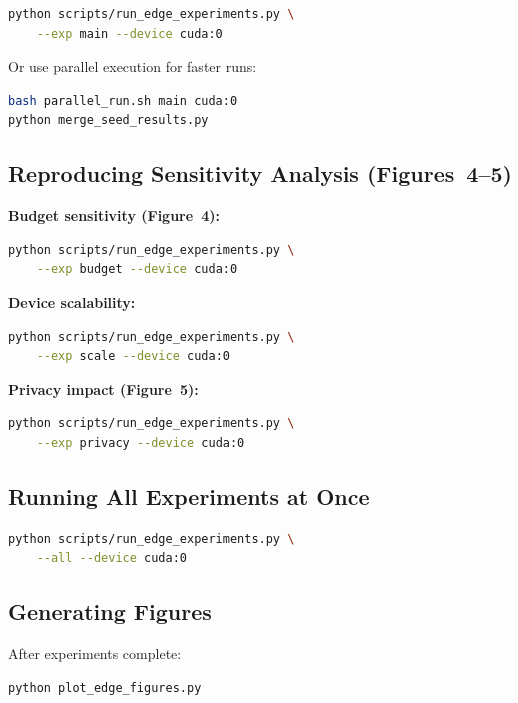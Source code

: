 \documentclass[conference]{IEEEtran}
\begin{document}
\begin{lstlisting}[language=bash]
python scripts/run_edge_experiments.py \
    --exp main --device cuda:0
\end{lstlisting}

Or use parallel execution for faster runs:

\begin{lstlisting}[language=bash]
bash parallel_run.sh main cuda:0
python merge_seed_results.py
\end{lstlisting}

\subsection{Reproducing Sensitivity Analysis (Figures~4--5)}

\textbf{Budget sensitivity (Figure~4):}

\begin{lstlisting}[language=bash]
python scripts/run_edge_experiments.py \
    --exp budget --device cuda:0
\end{lstlisting}

\textbf{Device scalability:}

\begin{lstlisting}[language=bash]
python scripts/run_edge_experiments.py \
    --exp scale --device cuda:0
\end{lstlisting}

\textbf{Privacy impact (Figure~5):}

\begin{lstlisting}[language=bash]
python scripts/run_edge_experiments.py \
    --exp privacy --device cuda:0
\end{lstlisting}

\subsection{Running All Experiments at Once}

\begin{lstlisting}[language=bash]
python scripts/run_edge_experiments.py \
    --all --device cuda:0
\end{lstlisting}

\subsection{Generating Figures}

After experiments complete:

\begin{lstlisting}[language=bash]
python plot_edge_figures.py
\end{lstlisting}
\end{document}
